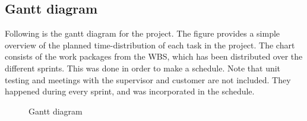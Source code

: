 \subsection{Gantt diagram}
\label{subsec:process_and_methodology-resource_management-gantt_diagram}

Following is the gantt diagram for the project. The figure provides a simple overview of the planned time-distribution of each task in the project. The chart consists of the work packages from the WBS, which has been distributed over the different sprints. This was done in order to make a schedule. Note that unit testing and meetings with the supervisor and customer are not included. They happened during every sprint, and was incorporated in the schedule.

\begin{center}
  \begin{figure}[ht!]
    \caption{Gantt diagram}
    \label{fig:gantt}
  \end{figure}
\end{center}

